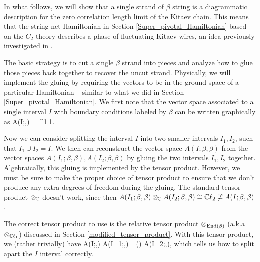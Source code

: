 In what follows, 
we will show that a single strand of $\beta$ string is a diagrammatic description for the zero correlation length limit of the Kitaev chain. 
This means that the string-net Hamiltonian in Section \ref{Super_pivotal_Hamiltonian} 
based on the $C_2$ theory describes a phase of fluctuating Kitaev wires, 
an idea previously investigated in \cite{tarantino2016,ware2016,kapustin2017}.

The basic strategy is to cut a single $\beta$ strand into pieces and analyze how to glue those pieces back together to recover the uncut strand.
Physically, we will implement the gluing by requiring the vectors to be in the ground space of a particular Hamiltonian -- similar to what we did in Section \ref{Super_pivotal_Hamiltonian}. 
We first note that the vector space associated to a single interval $I$ with boundary conditions labeled by $\beta$ can be written graphically as 
\be\label{VIbetabeta}
 A(I;\beta,\beta) = \cc \left[ \halfchain\;, \; \halfchaindot \right] \cong \cc^{1|1}.\ee
 
 Now we can consider splitting the interval $I$ into two smaller intervals $I_1,I_2$, such that $I_1\cup I_2 = I$.
 We then can reconstruct the vector space $A(I;\beta,\beta)$ from the vector 
 spaces $A(I_1;\beta,\beta),A(I_2;\beta,\beta)$ by gluing the two intervals $I_1,I_2$ together. 
Algebraically, this gluing is implemented by the tensor product. However, 
we must be sure to make the proper choice 
of tensor product to ensure that we don't produce any extra degrees of freedom during the gluing. 
The standard tensor product $\otimes_{\mathbb{C}}$ doesn't work, since then $A(I_1;\beta,\beta) \otimes_{\mathbb{C}} A(I_2;\beta,\beta) \cong \mathbb{C}\ell_2 \not\cong A(I;\beta,\beta)$. 

The correct tensor product to use is the relative tensor product $\otimes_{\text{End}(\beta)}$ (a.k.a $\otimes_{\mathbb{C}\ell_1}$) discussed in Section \ref{modified_tensor_product}. 
With this tensor product, we (rather trivially) have 
\be A(I;\beta,\beta) \cong A(I_1;\beta,\beta) \tp_{\End(\beta)} A(I_2;\beta,\beta),\ee
which tells us how to split apart the $I$ interval correctly. 

